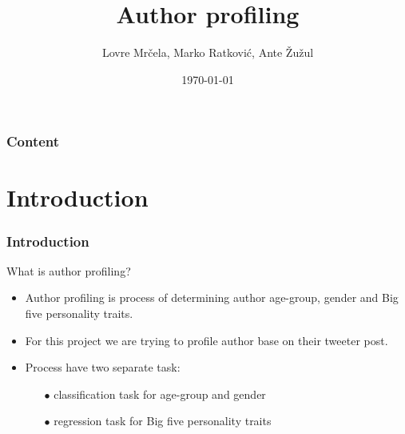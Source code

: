 \documentclass[utf8]{beamer}
\title[Author profiling]{Author profiling} %
\author[Mrčela, Ratković, Žužul]{Lovre Mrčela, Marko Ratković, Ante Žužul} %
\institute[FER] %
{
FAKULTET ELEKTROTEHNIKE I RAČUNARSTVA \\ %
\medskip
\textit{\{lovre.mrcela, marko.ratkovic, ante.zuzul\}@fer.hr} %
}
\date{\today} %
\begin{document}
\begin{frame}
\titlepage %
\end{frame}

\begin{frame}
\frametitle{Content} %
\tableofcontents %
\end{frame}


\section{Introduction} %
\frame{\tableofcontents[currentsection]}




\begin{frame}
	\frametitle{Introduction}
	What is author profiling?
	\pause
	\begin{itemize}
		\item Author profiling is process of determining author age-group, gender and Big five personality traits.
		\pause
		\item For this project we are trying to profile author base on their tweeter post.
		\pause
		\item Process have two separate task:
		\begin{itemize}
			\pause
			\item[$ \bullet $] classification task for age-group and gender
			\pause
			\item[$ \bullet $] regression task for Big five personality traits
		\end{itemize} 
	\end{itemize}
\end{frame}
\end{document}
